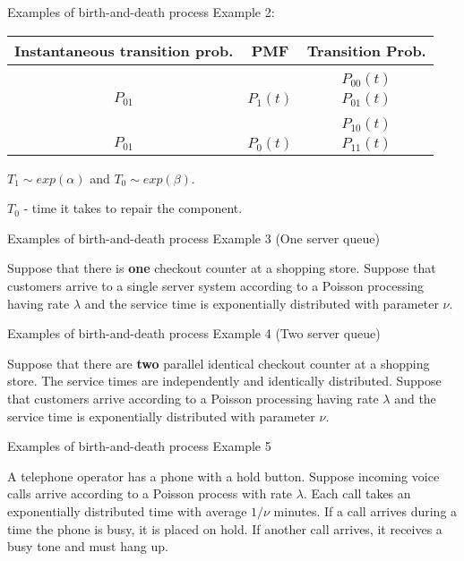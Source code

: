 \documentclass[12pt,ignorenonframetext,]{beamer}
\begin{document}
\begin{frame}{Examples of birth-and-death process}
\protect\hypertarget{examples-of-birth-and-death-process-5}{}
Example 2:

\begin{table}[]
\begin{tabular}{|c|c|c|}
\hline
              Instantaneous transition prob.    &   PMF                &  Transition Prob.\\ \hline
\multirow{2}{*}{} & \multirow{2}{*}{} &  \\
                &             &  $P_{00}(t)$ \\
          $P_{01}$        &      $P_1(t)$             &  $P_{01}(t)$\\ \hline
\multirow{2}{*}{} & \multirow{2}{*}{} &  \\  
& & $P_{10}(t)$ \\
           $P_{01}$         &        $P_0(t)$           &  $P_{11}(t)$\\ \hline
\end{tabular}
\end{table}

\(T_1 \sim exp(\alpha)\) and \(T_0 \sim exp(\beta)\).

\(T_0\) - time it takes to repair the component.
\end{frame}

\begin{frame}{Examples of birth-and-death process}
\protect\hypertarget{examples-of-birth-and-death-process-6}{}
Example 3 (One server queue)

Suppose that there is \textbf{one} checkout counter at a shopping store.
Suppose that customers arrive to a single server system according to a
Poisson processing having rate \(\lambda\) and the service time is
exponentially distributed with parameter \(\nu\).
\end{frame}

\begin{frame}{Examples of birth-and-death process}
\protect\hypertarget{examples-of-birth-and-death-process-7}{}
Example 4 (Two server queue)

Suppose that there are \textbf{two} parallel identical checkout counter
at a shopping store. The service times are independently and identically
distributed. Suppose that customers arrive according to a Poisson
processing having rate \(\lambda\) and the service time is exponentially
distributed with parameter \(\nu\).
\end{frame}

\begin{frame}{Examples of birth-and-death process}
\protect\hypertarget{examples-of-birth-and-death-process-8}{}
Example 5

A telephone operator has a phone with a hold button. Suppose incoming
voice calls arrive according to a Poisson process with rate \(\lambda\).
Each call takes an exponentially distributed time with average \(1/\nu\)
minutes. If a call arrives during a time the phone is busy, it is placed
on hold. If another call arrives, it receives a busy tone and must hang
up.
\end{frame}
\end{document}
